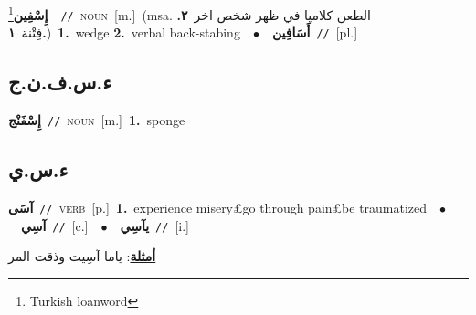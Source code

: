 \documentclass[10pt,a4paper,twoside]{article} %
\begin{document}
\begin{multicols}{2}
{\setlength\topsep{0pt}\textbf{\foreignlanguage{arabic}{إِسْفِين}}\footnote{Turkish loanword}\ \ {\color{gray}\texttt{//}\color{black}}\ \textsc{noun}\ [m.]\ \color{gray}(msa. \foreignlanguage{arabic}{الطعن كلاميا في ظهر شخص اخر}~\foreignlanguage{arabic}{\textbf{٢.}}  \foreignlanguage{arabic}{فِتْنة}~\foreignlanguage{arabic}{\textbf{١.}})\color{black}\ \textbf{1.}~wedge  \textbf{2.}~verbal back-stabing\ \ $\bullet$\ \ \setlength\topsep{0pt}\textbf{\foreignlanguage{arabic}{أَسَافِين}}\ {\color{gray}\texttt{//}\color{black}}\ [pl.]\ } \vspace{2mm}

\vspace{-3mm}
\subsection*{\color{blue}\foreignlanguage{arabic}{ء.س.ف.ن.ج}\color{blue}{ (ntws)}} 

{\setlength\topsep{0pt}\textbf{\foreignlanguage{arabic}{إِسْفَنْج}}\ {\color{gray}\texttt{//}\color{black}}\ \textsc{noun}\ [m.]\ \textbf{1.}~sponge\ } \vspace{2mm}

\vspace{-3mm}
\subsection*{\color{blue}\foreignlanguage{arabic}{ء.س.ي}\color{blue}{}} 

{\setlength\topsep{0pt}\textbf{\foreignlanguage{arabic}{آسَى}}\ {\color{gray}\texttt{//}\color{black}}\ \textsc{verb}\ [p.]\ \textbf{1.}~experience misery£go through pain£be traumatized\ \ $\bullet$\ \ \setlength\topsep{0pt}\textbf{\foreignlanguage{arabic}{آسِي}}\ {\color{gray}\texttt{//}\color{black}}\ [c.]\ \ $\bullet$\ \ \setlength\topsep{0pt}\textbf{\foreignlanguage{arabic}{يآسِي}}\ {\color{gray}\texttt{//}\color{black}}\ [i.]\  \begin{flushright}\color{gray}\foreignlanguage{arabic}{\textbf{\underline{\foreignlanguage{arabic}{أمثلة}}}: ياما آسِيت وذقت المر}\end{flushright}\color{black}} \vspace{2mm}


\end{multicols}
\end{document}
